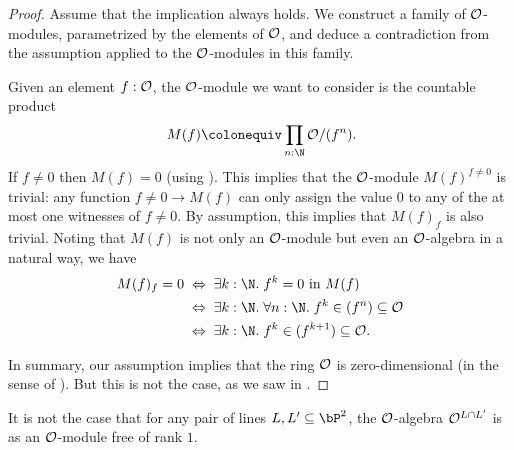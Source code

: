 \begin{proof}
  Assume that the implication always holds.
  We construct a family of $\mathcal O$-modules,
  parametrized by the elements of $\mathcal O$,
  and deduce a contradiction from the assumption
  applied to the $\mathcal O$-modules in this family.

  Given an element $f : \mathcal O$,
  the $\mathcal O$-module we want to consider is
  the countable product
  \[ M(f) \colonequiv \prod_{n : \N} \A/(f^n) \rlap{.} \]
  If $f \neq 0$ then $M(f) = 0$
  (using ).
  This implies that the $\mathcal O$-module $M(f)^{f \neq 0}$
  is trivial:
  any function $f \neq 0 \to M(f)$ can only assign the value $0$
  to any of the at most one witnesses of $f \neq 0$.
  By assumption, this implies that $M(f)_f$ is also trivial.
  Noting that
  $M(f)$ is not only an $\mathcal O$-module
  but even an $\mathcal O$-algebra in a natural way,
  we have
  \begin{align*}
    M(f)_f = 0
    &\;\Leftrightarrow\;
    \exists k : \N.\; \text{$f^k = 0$ in $M(f)$} \\
    &\;\Leftrightarrow\;
    \exists k : \N.\; \forall n : \N.\; f^k \in (f^n) \subseteq \A \\
    &\;\Leftrightarrow\;
    \exists k : \N.\; f^k \in (f^{k + 1}) \subseteq \A
    \rlap{.}
  \end{align*}

  In summary,
  our assumption implies that the ring $\mathcal O$ is zero-dimensional
  (in the sense of ).
  But this is not the case,
  as we saw in .
\end{proof}

\begin{example}
  It is not the case that
  for any pair of lines $L, L' \subseteq \bP^2$,
  the $\mathcal O$-algebra $\mathcal O^{L \cap L'}$ is
  as an $\mathcal O$-module free of rank $1$.
\end{example}

